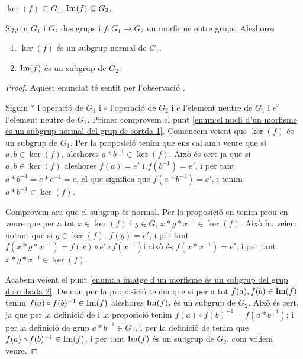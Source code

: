\documentclass[../Apunts.tex]{subfiles}
\begin{document}
	\begin{observation}
		\label{obs:nucli d'un morfisme entre grups es subconjunt del grup d'entrada, imatge n'és del de sortida}
		\(\ker(f)\subseteq G_{1}\), \(\operatorname{Im}(f)\subseteq G_{2}\).
	\end{observation}
	\begin{proposition}
		\label{prop:el nucli d'un morfisme és un subgrup normal del grup de sortda}
		\label{prop:la imatge d'un morfisme és un subgrup del grup d'arribada}
		Siguin \(G_{1}\) i \(G_{2}\) dos grups i \(f\colon G_{1}\to G_{2}\) un morfisme entre grups. Aleshores
		\begin{enumerate}
			\item\label{enum:el nucli d'un morfisme és un subgrup normal del grup de sortda 1} \(\ker(f)\) és un subgrup normal de \(G_{1}\).
			\item\label{enum:la imatge d'un morfisme és un subgrup del grup d'arribada 2} \(\operatorname{Im}(f)\) és un subgrup de \(G_{2}\).
		\end{enumerate}
		\begin{proof}
			Aquest enunciat té sentit per l'observació .
			
			Siguin \(\ast\) l'operació de \(G_{1}\) i \(\circ\) l'operació de \(G_{2}\) i \(e\) l'element neutre de \(G_{1}\) i \(e'\) l'element neutre de \(G_{2}\). Primer comprovem el punt \eqref{enum:el nucli d'un morfisme és un subgrup normal del grup de sortda 1}. Comencem veient que \(\ker(f)\) és un subgrup de \(G_{1}\). Per la proposició  tenim que ens cal amb veure que si \(a,b\in\ker(f)\), aleshores \(a\ast b^{-1}\in\ker(f)\). Això és cert ja que si \(a,b\in\ker(f)\) aleshores \(f(a)=e'\) i \(f(b^{-1})=e'\), i per tant \(a\ast b^{-1}=e\ast e^{-1}=e\), el que significa que \(f(a\ast b^{-1})=e'\), i tenim \(a\ast b^{-1}\in\ker(f)\).
			
			Comprovem ara que el subgrup és normal. Per la proposició  en tenim prou en veure que per a tot \(x\in\ker(f)\) i \(g\in G\), \(x\ast g\ast x^{-1}\in\ker(f)\). Això ho veiem notant que si \(g\in\ker(f)\), \(f(g)=e'\), i per tant \(f(x\ast g\ast x^{-1})=f(x)\circ e'\circ f(x^{-1})\)i això és \(f(x\ast x^{-1})=e'\), i per tant \(x\ast g\ast x^{-1}\in\ker(f)\).
			
			Acabem veient el punt \eqref{enum:la imatge d'un morfisme és un subgrup del grup d'arribada 2}. De nou per la proposició  tenim que si per a tot \(f(a),f(b)\in\operatorname{Im}(f)\) tenim \(f(a)\circ f(b)^{-1}\in\operatorname{Im}(f)\) aleshores \(\operatorname{Im}(f),\) és un subgrup de \(G_{2}\). Això és cert, ja que per la definició de  i la proposició  tenim \(f(a)\circ f(b)^{-1}=f(a\ast b^{-1})\); i per la definició de grup \(a\ast b^{-1}\in G_{1}\), i per la definició de  tenim que \(f(a)\circ f(b)^{-1}\in\operatorname{Im}(f)\), i per tant \(\operatorname{Im}(f)\) és un subgrup de \(G_{2}\), com volíem veure.
		\end{proof}
	\end{proposition}
\end{document}
